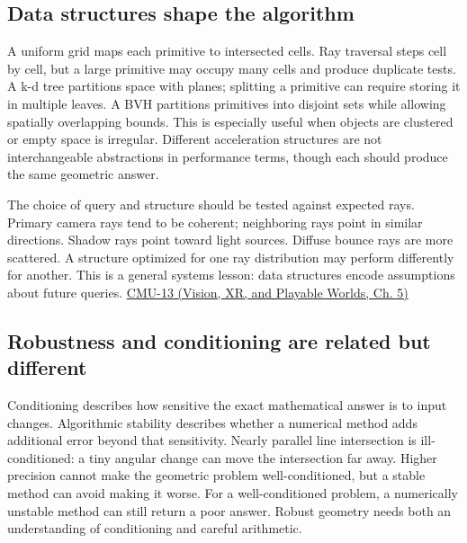 \subsection{Data structures shape the algorithm}\label{04-visual-computing-ii-ch029-data-structures-shape-the-algorithm}

\hypertarget{04-visual-computing-ii-ch029-data-structures-shape-the-algorithm}{}

A uniform grid maps each primitive to intersected cells. Ray traversal steps cell by cell, but a large primitive may occupy many cells and produce duplicate tests. A k-d tree partitions space with planes; splitting a primitive can require storing it in multiple leaves. A BVH partitions primitives into disjoint sets while allowing spatially overlapping bounds. This is especially useful when objects are clustered or empty space is irregular. Different acceleration structures are not interchangeable abstractions in performance terms, though each should produce the same geometric answer.

The choice of query and structure should be tested against expected rays. Primary camera rays tend to be coherent; neighboring rays point in similar directions. Shadow rays point toward light sources. Diffuse bounce rays are more scattered. A structure optimized for one ray distribution may perform differently for another. This is a general systems lesson: data structures encode assumptions about future queries. \href{../07-Vision-XR-and-Playable-Worlds/main.pdf\#nameddest=04-visual-computing-ii-ch036-cmu-13---spatial-data-structures}{CMU-13 (Vision, XR, and Playable Worlds, Ch. 5)}

\subsection{Robustness and conditioning are related but different}\label{04-visual-computing-ii-ch029-robustness-and-conditioning-are-related-but-different}

\hypertarget{04-visual-computing-ii-ch029-robustness-and-conditioning-are-related-but-different}{}

Conditioning describes how sensitive the exact mathematical answer is to input changes. Algorithmic stability describes whether a numerical method adds additional error beyond that sensitivity. Nearly parallel line intersection is ill-conditioned: a tiny angular change can move the intersection far away. Higher precision cannot make the geometric problem well-conditioned, but a stable method can avoid making it worse. For a well-conditioned problem, a numerically unstable method can still return a poor answer. Robust geometry needs both an understanding of conditioning and careful arithmetic.

